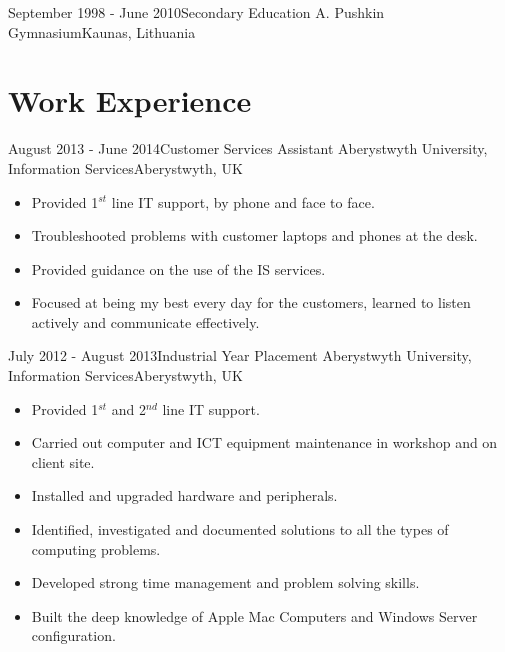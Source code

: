 \documentclass[11pt,a4paper]{moderncv}
\begin{document}
\cventry
	{September 1998 - June 2010}{Secondary Education}
	{A. Pushkin Gymnasium}{Kaunas, Lithuania}
	{}{}
		
\section{Work Experience}

\cventry
	{August 2013 - June 2014}{Customer Services Assistant}
	{Aberystwyth University, Information Services}{Aberystwyth, UK}
	{}{
        \begin{itemize}
            \item Provided 1$^{st}$ line IT support, by phone and face to face.
            \item Troubleshooted problems with customer laptops and phones at the desk.
            \item Provided guidance on the use of the IS services.
            \item Focused at being my best every day for the customers, learned to listen actively and communicate effectively.
        \end{itemize}
    }
	
\cventry
	{July 2012 - August 2013}{Industrial Year Placement}
	{Aberystwyth University, Information Services}{Aberystwyth, UK}
	{}{
        \begin{itemize}
            \item Provided 1$^{st}$ and 2$^{nd}$ line IT support.
            \item Carried out computer and ICT equipment maintenance in workshop and on client site.
            \item Installed and upgraded hardware and peripherals.
            \item Identified, investigated and documented solutions to all the types of computing problems.
            \item Developed strong time management and problem solving skills.
            \item Built the deep knowledge of Apple Mac Computers and Windows Server configuration. 
        \end{itemize}
    }
    
\end{document}

